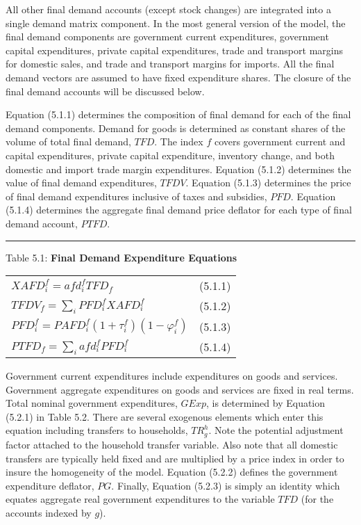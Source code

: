 \documentclass{article}
\begin{document}
All other final demand accounts (except stock changes) are integrated into a single demand matrix component. In the most general version of the model, the final demand components are government current expenditures, government capital expenditures, private capital expenditures, trade and transport margins for domestic sales, and trade and transport margins for imports. All the final demand vectors are assumed to have fixed expenditure shares. The closure of the final demand accounts will be discussed below.

Equation (5.1.1) determines the composition of final demand for each of the final demand components. Demand for goods is determined as constant shares of the volume of total final demand, $TFD$. The index $f$ covers government current and capital expenditures, private capital expenditure, inventory change, and both domestic and import trade margin expenditures. Equation (5.1.2) determines the value of final demand expenditures, $TFDV$. Equation (5.1.3) determines the price of final demand expenditures inclusive of taxes and subsidies, $PFD$. Equation (5.1.4) determines the aggregate final demand price deflator for each type of final demand account, $PTFD$.

\newpage

\noindent\rule{\linewidth}{0.4pt}
\begin{center}
\begin{large}
{\centering Table 5.1: \textbf{Final Demand Expenditure Equations} \par}

\begin{tabular}{>{\raggedright}p{} l}

$X\!AFD^f_i = afd^f_iTFD_f$ & (5.1.1)\\[15pt]

$TFDV_f = \displaystyle \sum_i PFD^f_i X\!AFD^f_i$ & (5.1.2)\\[15pt]

$PFD^f_i = PAFD^f_i\left(1 + \tau^f_i\right)\left(1-\varphi^f_i\right)$ & (5.1.3)\\[15pt]

$PTFD_f = \displaystyle \sum_i afd^f_iPFD^f_i$ & (5.1.4) \\[20pt]

\hline
\end{tabular}
\end{large}
\end{center}

Government current expenditures include expenditures on goods and services. Government aggregate expenditures on goods and services are fixed in real terms. Total nominal government expenditures, $GExp$, is determined by Equation (5.2.1) in Table 5.2. There are several exogenous elements which enter this equation including transfers to households, $TR_g^h$. Note the potential adjustment factor attached to the household transfer variable. Also note that all domestic transfers are typically held fixed and are multiplied by a price index in order to insure the homogeneity of the model. Equation (5.2.2) defines the government expenditure deflator, $PG$. Finally, Equation (5.2.3) is simply an identity which equates aggregate real government expenditures to the variable $TFD$ (for the accounts indexed by $g$).
\end{document}

